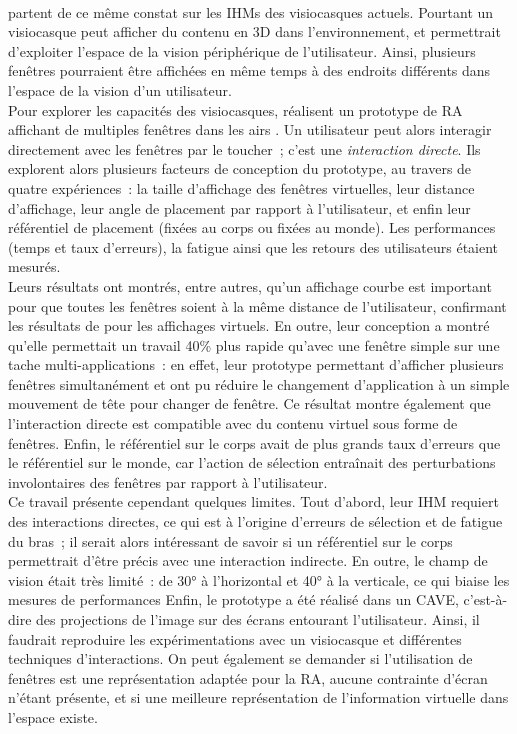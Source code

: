 \paragraph*{}
\citet{EnsFinneganIrani2014} partent de ce même constat sur les IHMs des visiocasques actuels. Pourtant un visiocasque peut afficher du contenu en 3D dans l'environnement, et permettrait d'exploiter l'espace de la vision périphérique de l'utilisateur. Ainsi, plusieurs fenêtres pourraient être affichées en même temps à des endroits différents dans l'espace de la vision d'un utilisateur.\\
Pour explorer les capacités des visiocasques, \citeauthor{EnsFinneganIrani2014} réalisent un prototype de RA affichant de multiples fenêtres dans les airs . Un utilisateur peut alors interagir directement avec les fenêtres par le toucher~; c'est une \emph{interaction directe}. Ils explorent alors plusieurs facteurs de conception du prototype, au travers de quatre expériences~: la taille d'affichage des fenêtres virtuelles, leur distance d'affichage, leur angle de placement par rapport à l'utilisateur, et enfin leur référentiel de placement (fixées au corps ou fixées au monde). Les performances (temps et taux d'erreurs), la fatigue ainsi que les retours des utilisateurs étaient mesurés.\\ 
Leurs résultats ont montrés, entre autres, qu'un affichage courbe est important pour que toutes les fenêtres soient à la même distance de l'utilisateur, confirmant les résultats de \citet{ShuppBallYostEtAl2006} pour les affichages virtuels. En outre, leur conception a montré qu'elle permettait un travail 40\% plus rapide qu'avec une fenêtre simple sur une tache multi-applications~: en effet, leur prototype permettant d'afficher plusieurs fenêtres simultanément et \citeauthor{EnsFinneganIrani2014} ont pu réduire le changement d'application à un simple mouvement de tête pour changer de fenêtre. Ce résultat montre également que l'interaction directe est compatible avec du contenu virtuel sous forme de fenêtres. Enfin, le référentiel sur le corps avait de plus grands taux d'erreurs que le référentiel sur le monde, car l'action de sélection entraînait des perturbations involontaires des fenêtres par rapport à l'utilisateur.\\ 
Ce travail présente cependant quelques limites. Tout d'abord, leur IHM requiert des interactions directes, ce qui est à l'origine d'erreurs de sélection et de fatigue du bras~; il serait alors intéressant de savoir si un référentiel sur le corps permettrait d'être précis avec une interaction indirecte. En outre, le champ de vision était très limité~: de 30° à l'horizontal et 40° à la verticale, ce qui biaise les mesures de performances Enfin, le prototype a été réalisé dans un CAVE, c'est-à-dire des projections de l'image sur des écrans entourant l'utilisateur. Ainsi, il faudrait reproduire les expérimentations avec un visiocasque et différentes techniques d'interactions. On peut également se demander si l'utilisation de fenêtres est une représentation adaptée pour la RA, aucune contrainte d'écran n'étant présente, et si une meilleure représentation de l'information virtuelle dans l'espace existe.

